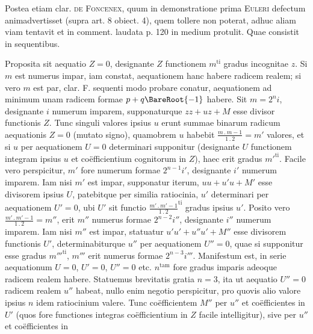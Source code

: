 Postea etiam clar. \textsc{de Foncenex}, quum in demonstratione prima \textsc{Euleri} defectum
animadvertisset (supra art. 8 obiect. 4), quem tollere non poterat, adhuc
aliam viam tentavit et in comment. laudata p. 120 in medium protulit.
Quae consistit in sequentibus.

Proposita sit aequatio $Z=0$, designante $Z$ functionem $m^{\mathrm{ti}}$ gradus incognitae
$z$. Si $m$ est numerus impar, iam constat, aequationem hanc habere
radicem realem; si vero $m$ est par, clar. F. sequenti modo probare conatur, aequationem
ad minimum unam radicem formae $p+q\BareRoot{-1}$ habere. Sit $m=2^n i$,
designante $i$ numerum imparem, supponaturque $zz+uz+M$ esse divisor
functionis $Z$. Tunc singuli valores ipsius $u$ erunt summae binarum radicum aequationis
$Z=0$ (mutato signo), quamobrem $u$ habebit $\frac{m\mathbin{.}m-1}{1\mathbin{.}2}=m'$ valores,
et si $u$ per aequationem $U=0$ determinari supponitur (designante $U$ functionem
integram ipsius $u$ et coëfficientium cognitorum in $Z$), haec erit gradus $m'^{\mathrm{ti}}$.
Facile vero perspicitur, $m'$ fore numerum formae $2^{n-1}i'$, designante $i'$ numerum
imparem. Iam nisi $m'$ est impar, supponatur iterum, $uu+u'u+M'$ esse divisorem
ipsius $U$, patebitque per similia ratiocinia, $u'$ determinari per aequationem $U'=0$,
ubi $U'$ sit functio $\frac{m'\mathbin{.}m'-1}{1\mathbin{.}2}^{\mathrm{ti}}$ gradus ipsius $u'$. Posito vero $\frac{m'\mathbin{.}m'-1}{1\mathbin{.}2}=m''$, erit $m''$
numerus formae $2^{n-2}i''$, designante $i''$ numerum imparem. Iam nisi $m''$ est impar,
statuatur $u'u'+u''u'+M''$ esse divisorem functionis $U'$, determinabiturque
$u''$ per aequationem $U''=0$, quae si supponitur esse gradus $m'''^{\mathrm{ti}}$, $m'''$ erit numerus
formae $2^{n-3}i'''$. Manifestum est, in serie aequationum $U=0$, $U'=0$,
$U''=0$ etc. $n^{\mathrm{tam}}$ fore gradus imparis adeoque radicem realem habere. Statuemus
brevitatis gratia $n=3$, ita ut aequatio $U''=0$ radicem realem $u''$ habeat,
nullo enim negotio perspicitur, pro quovis alio valore ipsius $n$ idem ratiocinium
valere. Tunc coëfficientem $M''$ per $u''$ et coëfficientes in $U'$ (quos fore functiones
integras coëfficientium in $Z$ facile intelligitur), sive per $u''$ et coëfficientes in

